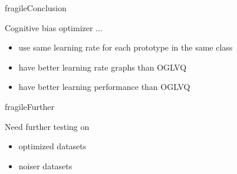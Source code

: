 \documentclass[
	aspectratio=169,	%
	onlytextwidth,		%
	t,					%
	]{beamer}
\begin{document}
	
	
	\begin{frame}{fragile}{Conclusion}
		
		Cognitive bias optimizer ...
		\begin{itemize}
			\item <1-> use same learning rate for each prototype in the same class
			\item <2-> have better learning rate graphs than OGLVQ
			\item <3->  have better learning performance than OGLVQ

		\end{itemize}
		
	\end{frame}

	\begin{frame}{fragile}{Further}
	
		Need further testing on
		\begin{itemize}

			\item <1-> optimized datasets
			\item <2-> noiser datasets

		\end{itemize}


	\end{frame}

	
	\appendix
	
	\makebibliography

	\makethankyou
\end{document}
